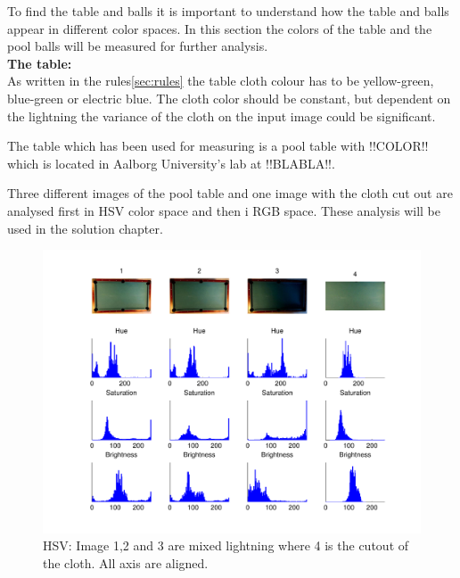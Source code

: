 To find the table and balls it is important to understand how the table and balls appear in different color spaces. In this section the colors of the table and the pool balls will be measured for further analysis.\\

\textbf{The table:}\\
As written in the rules\ref{sec:rules} the table cloth colour has to be yellow-green, blue-green or electric blue. The cloth color should be constant, but dependent on the lightning the variance of the cloth on the input image could be significant.

The table which has been used for measuring is a pool table with !!COLOR!! which is located in Aalborg University's lab at !!BLABLA!!. 

Three different images of the pool table and one image with the cloth cut out are analysed first in HSV color space and then i RGB space. These analysis will be used in the solution chapter.

\begin{figure}[H]
\begin{center}
\leavevmode
\includegraphics[width=1\textwidth]{images/hsv_hist_table}
\end{center}
\caption{HSV: Image 1,2 and 3 are mixed lightning where 4 is the cutout of the cloth. All axis are aligned.}
\label{fig:tablehsv}
\end{figure}

